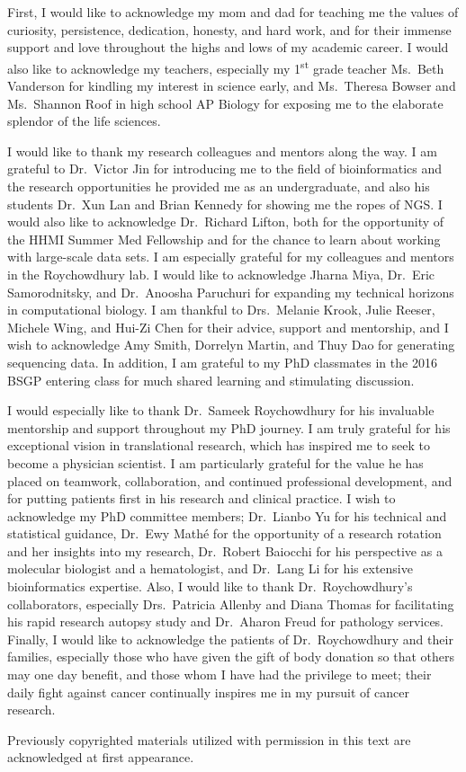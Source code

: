 \begin{acknowledgements}
First, I would like to acknowledge my mom and dad for teaching me the values of curiosity, persistence, dedication, honesty, and hard work, and for their immense support and love throughout the highs and lows of my academic career. I would also like to acknowledge my teachers, especially my 1\textsuperscript{st} grade teacher Ms.\ Beth Vanderson for kindling my interest in science early, and Ms.\ Theresa Bowser and Ms.\ Shannon Roof in high school AP Biology for exposing me to the elaborate splendor of the life sciences.

I would like to thank my research colleagues and mentors along the way. I am grateful to Dr.\ Victor Jin for introducing me to the field of bioinformatics and the research opportunities he provided me as an undergraduate, and also his students Dr.\ Xun Lan and Brian Kennedy for showing me the ropes of NGS\@. I would also like to acknowledge Dr.\ Richard Lifton, both for the opportunity of the HHMI Summer Med Fellowship and for the chance to learn about working with large-scale data sets. I am especially grateful for my colleagues and mentors in the Roychowdhury lab. I would like to acknowledge Jharna Miya, Dr.\ Eric Samorodnitsky, and Dr.\ Anoosha Paruchuri for expanding my technical horizons in computational biology. I am thankful to Drs.\ Melanie Krook, Julie Reeser, Michele Wing, and Hui-Zi Chen for their advice, support and mentorship, and I wish to acknowledge Amy Smith, Dorrelyn Martin, and Thuy Dao for generating sequencing data. In addition, I am grateful to my PhD classmates in the 2016 BSGP entering class for much shared learning and stimulating discussion.

I would especially like to thank Dr.\ Sameek Roychowdhury for his invaluable mentorship and support throughout my PhD journey. I am truly grateful for his exceptional vision in translational research, which has inspired me to seek to become a physician scientist. I am particularly grateful for the value he has placed on teamwork, collaboration, and continued professional development, and for putting patients first in his research and clinical practice. I wish to acknowledge my PhD committee members; Dr.\ Lianbo Yu for his technical and statistical guidance, Dr.\ Ewy Math\'e for the opportunity of a research rotation and her insights into my research, Dr.\ Robert Baiocchi for his perspective as a molecular biologist and a hematologist, and Dr.\ Lang Li for his extensive bioinformatics expertise. Also, I would like to thank Dr.\ Roychowdhury's collaborators, especially Drs.\ Patricia Allenby and Diana Thomas for facilitating his rapid research autopsy study and Dr.\ Aharon Freud for pathology services. Finally, I would like to acknowledge the patients of Dr.\ Roychowdhury and their families, especially those who have given the gift of body donation so that others may one day benefit, and those whom I have had the privilege to meet; their daily fight against cancer continually inspires me in my pursuit of cancer research.

Previously copyrighted materials utilized with permission in this text are acknowledged at first appearance.
\end{acknowledgements}
